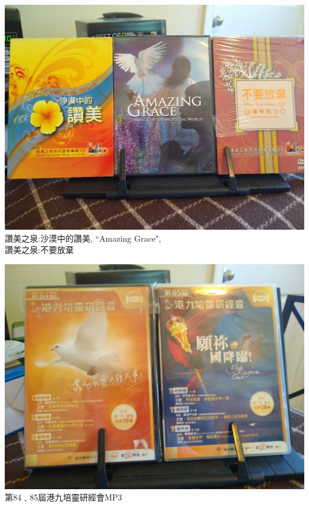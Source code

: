 \documentclass[t]{beamer}
\newcommand{\htarget}[2]{\hypertarget{#1}{#2}}
\begin{document}
\begin{frame}\htarget{praise}{} \begin{center}
\includegraphics[height=0.8\textheight]{dvd03_mini.jpg} \\
讚美之泉:沙漠中的讚美, ``Amazing Grace", \\
讚美之泉:不要放棄
\end{center} \end{frame}
\begin{frame}\htarget{hongkong}{} \begin{center}
\includegraphics[height=0.8\textheight]{dvd04_mini.jpg} \\
第84﹑85屆港九培靈研經會MP3
\end{center} \end{frame}
\end{document}
